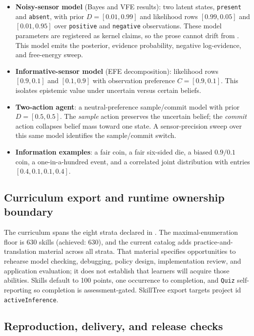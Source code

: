 \documentclass[
  english,
]{article}
\providecommand{\tightlist}{%
  \setlength{\itemsep}{0pt}\setlength{\parskip}{0pt}}
\begin{document}
\begin{itemize}
\tightlist
\item
  \textbf{Noisy-sensor model} (Bayes and VFE results): two latent
  states, \texttt{present} and \texttt{absent}, with prior
  \(D=[0.01, 0.99]\) and likelihood rows \([0.99, 0.05]\) and
  \([0.01, 0.95]\) over \texttt{positive} and \texttt{negative}
  observations. These model parameters are registered as kernel claims,
  so the prose cannot drift from . This
  model emits the posterior, evidence probability, negative
  log-evidence, and free-energy sweep.
\item
  \textbf{Informative-sensor model} (EFE decomposition): likelihood rows
  \([0.9, 0.1]\) and \([0.1, 0.9]\) with observation preference
  \(C=[0.9, 0.1]\). This isolates epistemic value under uncertain versus
  certain beliefs.
\item
  \textbf{Two-action agent}: a neutral-preference sample/commit model
  with prior \(D=[0.5,0.5]\). The \emph{sample} action preserves the
  uncertain belief; the \emph{commit} action collapses belief mass
  toward one state. A sensor-precision sweep over this same model
  identifies the sample/commit switch.
\item
  \textbf{Information examples}: a fair coin, a fair six-sided die, a
  biased \(0.9/0.1\) coin, a one-in-a-hundred event, and a correlated
  joint distribution with entries \([0.4,0.1,0.1,0.4]\).
\end{itemize}

\subsection{Curriculum export and runtime ownership
boundary}\label{curriculum-export-and-runtime-ownership-boundary}

The curriculum spans the eight strata declared in
. The maximal-enumeration floor is 630
skills (achieved: 630), and the current catalog adds
practice-and-translation material across all strata. That material
specifies opportunities to rehearse model checking, debugging, policy
design, implementation review, and application evaluation; it does not
establish that learners will acquire those abilities. Skills default to
100 points, one occurrence to completion, and \texttt{Quiz}
self-reporting so completion is assessment-gated. SkillTree export
targets project id \texttt{activeInference}.

\subsection{Reproduction, delivery, and release
checks}\label{reproduction-delivery-and-release-checks}
\end{document}
